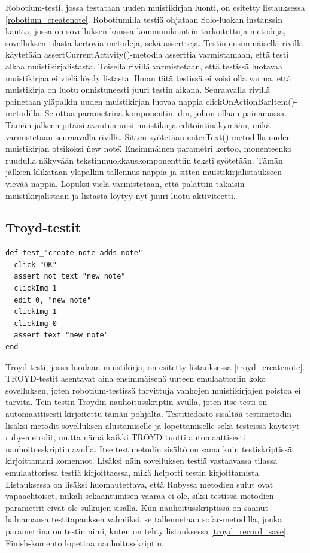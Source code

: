 Robotium-testi, jossa testataan uuden muistikirjan luonti, on esitetty listauksessa \ref{robotium_createnote}. Robotiumilla testiä ohjataan Solo-luokan instanssin kautta, jossa on sovelluksen kanssa kommunikointiin tarkoitettuja metodeja, sovelluksen tilasta kertovia metodeja, sekä assertteja. Testin ensimmäisellä rivillä käytetään assertCurrentActivity()-metodia asserttia varmistamaan, että testi alkaa muistikirjalistasta. Toisella rivillä varmistetaan, että testissä luotavaa muistikirjaa ei vielä löydy listasta. Ilman tätä testissä ei voisi olla varma, että muistikirja on luotu onnistuneesti juuri testin aikana. Seuraavalla rivillä painetaan yläpalkin uuden muistikirjan luovaa nappia clickOnActionBarItem()-metodilla. Se ottaa parametrina komponentin id:n, johon ollaan painamassa. Tämän jälkeen pitäisi avautua uusi muistikirja editointinäkymään, mikä varmistetaan seuraavalla rivillä. Sitten syötetään enterText()-metodilla uuden muistikirjan otsikoksi \"new note\". Ensimmäinen parametri kertoo, monenteenko ruudulla näkyvään tekstinmuokkauskomponenttiin teksti syötetään. Tämän jälkeen klikataan yläpalkin tallennus-nappia ja sitten muistikirjalistaukseen vievää nappia. Lopuksi vielä varmistetaan, että palattiin takaisin muistikirjalistaan ja listasta löytyy nyt juuri luotu aktiviteetti.

\subsection{Troyd-testit}

\begin{lstlisting}[float, label=troyd_createnote,caption=Muistikirjan luontitesti Troydilla]
def test_"create note adds note"
  click "OK"
  assert_not_text "new note"
  clickImg 1
  edit 0, "new note"
  clickImg 1
  clickImg 0
  assert_text "new note"
end
\end{lstlisting}

Troyd-testi, jossa luodaan muistikirja, on esitetty listauksessa \ref{troyd_createnote}. TROYD-testit asentavat aina ensimmäisenä uuteen emulaattoriin koko sovelluksen, joten robotium-testissä tarvittuja vanhojen muistikirjojen poistoa ei tarvita. Tein testin Troydin nauhoitusskriptin avulla, joten itse testi on automaattisesti kirjoitettu tämän pohjalta. Testitiedosto sisältää testimetodin lisäksi metodit sovelluksen alustamiselle ja lopettamiselle sekä testeissä käytetyt ruby-metodit, mutta nämä kaikki TROYD tuotti automaattisesti nauhoitusskriptin avulla. Itse testimetodin sisältö on sama kuin testiskriptissä kirjoittamani komennot. Lisäksi näin sovelluksen testiä vastaavassa tilassa emulaattorissa testiä kirjoittaessa, mikä helpotti testin kirjoittamista. Listauksessa on lisäksi huomautettava, että Rubyssa metodien sulut ovat vapaaehtoiset, mikäli sekaantumisen vaaraa ei ole, siksi testissä metodien parametrit eivät ole sulkujen sisällä. Kun nauhoitusskriptissä on saanut haluamansa testitapauksen valmiiksi, se tallennetaan sofar-metodilla, jonka parametrina on testin nimi, kuten on tehty listauksessa \ref{troyd_record_save}. Finish-komento lopettaa nauhoitusskriptin.

